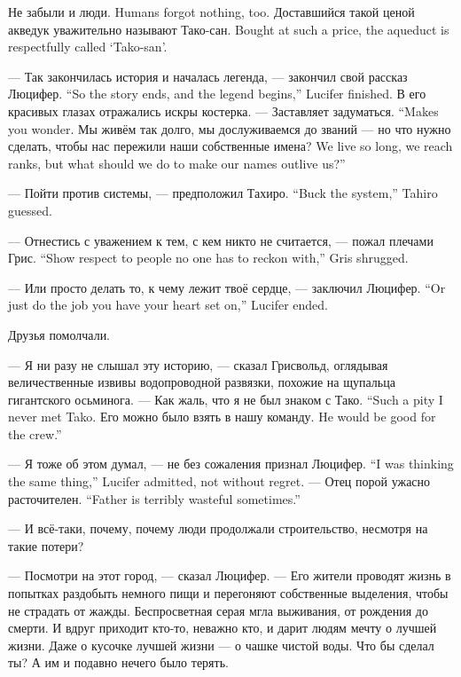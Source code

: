 {Не забыли и люди.}
{Humans forgot nothing, too.}
{Доставшийся такой ценой акведук уважительно называют Тако-сан.}
{Bought at such a price, the aqueduct is respectfully called `Tako-san'.}

{--- Так закончилась история и началась легенда, --- закончил свой рассказ Люцифер.}
{``So the story ends, and the legend begins,'' Lucifer finished.}
В его красивых глазах отражались искры костерка.
{--- Заставляет задуматься.}
{``Makes you wonder.}
{Мы живём так долго, мы дослуживаемся до званий --- но что нужно сделать, чтобы нас пережили наши собственные имена?}
{We live so long, we reach ranks, but what should we do to make our names outlive us?''}

{--- Пойти против системы, --- предположил Тахиро.}
{``Buck the system,'' Tahiro guessed.}

{--- Отнестись с уважением к тем, с кем никто не считается, --- пожал плечами Грис.}
{``Show respect to people no one has to reckon with,'' Gris shrugged.}

{--- Или просто делать то, к чему лежит твоё сердце, --- заключил Люцифер.}
{``Or just do the job you have your heart set on,'' Lucifer ended.}

Друзья помолчали.

--- Я ни разу не слышал эту историю, --- сказал Грисвольд, оглядывая величественные извивы водопроводной развязки, похожие на щупальца гигантского осьминога.
{--- Как жаль, что я не был знаком с Тако.}
{``Such a pity I never met Tako.}
{Его можно было взять в нашу команду.}
{He would be good for the crew.''}

{--- Я тоже об этом думал, --- не без сожаления признал Люцифер.}
{``I was thinking the same thing,'' Lucifer admitted, not without regret.}
{--- Отец порой ужасно расточителен.}
{``Father is terribly wasteful sometimes.''}

--- И всё-таки, почему, почему люди продолжали строительство, несмотря на такие потери?

--- Посмотри на этот город, --- сказал Люцифер.
--- Его жители проводят жизнь в попытках раздобыть немного пищи и перегоняют собственные выделения, чтобы не страдать от жажды.
Беспросветная серая мгла выживания, от рождения до смерти.
И вдруг приходит кто-то, неважно кто, и дарит людям мечту о лучшей жизни.
Даже о кусочке лучшей жизни --- о чашке чистой воды.
Что бы сделал ты?
А им и подавно нечего было терять.

